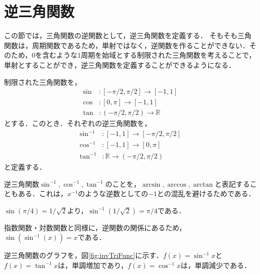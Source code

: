 \section{逆三角関数}
この節では，三角関数の逆関数として，逆三角関数を定義する．
そもそも三角関数は，周期関数であるため，単射ではなく，逆関数を作ることができない．そのため，0を含むような1周期を始域とする制限された三角関数を考えることで，単射とすることができ，逆三角関数を定義することができるようになる．
　
\begin{definition}[逆三角関数]
	制限された三角関数を，
	\begin{align*}
		\sin &: [-\pi/2, \pi/2] \rightarrow [-1, 1] \\
		\cos &: [0, \pi] \rightarrow [-1, 1] \\
		\tan &: (-\pi/2, \pi/2) \rightarrow \mathbb{R}
	\end{align*}
	とする．このとき．それぞれの逆三角関数を，
	\begin{align*}
		\sin^{-1} &: [-1, 1] \rightarrow [-\pi/2, \pi/2] \\
		\cos^{-1} &: [-1, 1] \rightarrow [0, \pi] \\
		\tan^{-1} &: \mathbb{R} \rightarrow (-\pi/2, \pi/2)
	\end{align*}
	と定義する．
\end{definition}
\begin{rem*}
	逆三角関数$\sin^{-1}, \cos^{-1}, \tan^{-1}$のことを，$\arcsin, \arccos, \arctan$と表記することもある．これは，$x^{-1}$のような逆数としての$-1$との混乱を避けるためである．
\end{rem*}
\begin{example*}
	$\sin(\pi/4) = 1/\sqrt{2}$より，$\sin^{-1}(1/\sqrt{2}) = \pi/4$である．
\end{example*}
\begin{example*}
	指数関数・対数関数と同様に，逆関数の関係にあるため，$\sin(\sin^{-1}(x)) = x$である．
\end{example*}

逆三角関数のグラフを，図\ref{fig:invTriFunc}に示す．$f(x) = \sin^{-1}x$と$f(x) = \tan^{-1}x$は，単調増加であり，$f(x) = \cos^{-1}x$は，単調減少である．

